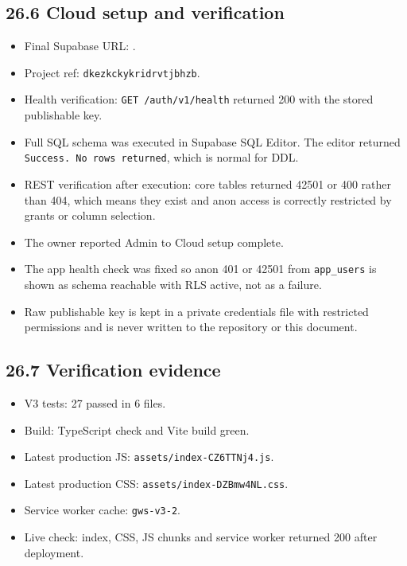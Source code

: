 \documentclass[11pt]{article}
\begin{document}
\subsection{26.6 Cloud setup and verification}
\begin{itemize}[leftmargin=*,itemsep=2pt,topsep=2pt]
\item Final Supabase URL: .
\item Project ref: \texttt{dkezkckykridrvtjbhzb}.
\item Health verification: \texttt{GET /auth/v1/health} returned 200 with the stored publishable key.
\item Full SQL schema was executed in Supabase SQL Editor. The editor returned \texttt{Success. No rows returned}, which is normal for DDL.
\item REST verification after execution: core tables returned 42501 or 400 rather than 404, which means they exist and anon access is correctly restricted by grants or column selection.
\item The owner reported Admin to Cloud setup complete.
\item The app health check was fixed so anon 401 or 42501 from \texttt{app\_users} is shown as schema reachable with RLS active, not as a failure.
\item Raw publishable key is kept in a private credentials file with restricted permissions and is never written to the repository or this document.
\end{itemize}
\subsection{26.7 Verification evidence}
\begin{itemize}[leftmargin=*,itemsep=2pt,topsep=2pt]
\item V3 tests: 27 passed in 6 files.
\item Build: TypeScript check and Vite build green.
\item Latest production JS: \texttt{assets/index-CZ6TTNj4.js}.
\item Latest production CSS: \texttt{assets/index-DZBmw4NL.css}.
\item Service worker cache: \texttt{gws-v3-2}.
\item Live check: index, CSS, JS chunks and service worker returned 200 after deployment.
\end{itemize}
\end{document}
